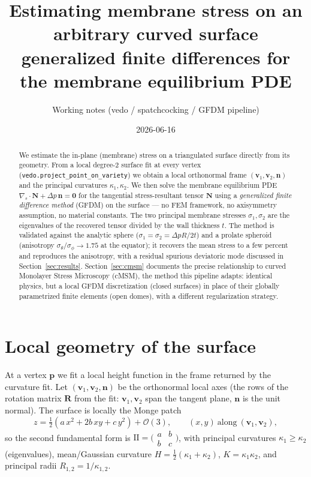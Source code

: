 \documentclass[11pt]{article}
\title{Estimating membrane stress on an arbitrary curved surface\\
\large generalized finite differences for the membrane equilibrium PDE}
\author{Working notes (vedo / spatchcocking / GFDM pipeline)}
\date{2026-06-16}
\newcommand{\vv}[1]{\bm{#1}}
\newcommand{\R}{\mathbf{R}}
\newcommand{\NN}{\mathbf{N}}
\newcommand{\nn}{\vv{n}}
\newcommand{\kone}{\kappa_1}
\newcommand{\ktwo}{\kappa_2}
\newcommand{\Hmean}{H}
\newcommand{\Kgauss}{K}
\newcommand{\divs}{\nabla_{\!s}\!\cdot}
\begin{document}
\maketitle

\begin{abstract}
We estimate the in-plane (membrane) stress on a triangulated surface directly from its
geometry. From a local degree-2 surface fit at every vertex
(\texttt{vedo.project\_point\_on\_variety}) we obtain a local orthonormal frame
$(\vv{v}_1,\vv{v}_2,\vv{n})$ and the principal curvatures $\kone,\ktwo$. We then solve the
membrane equilibrium PDE $\divs\NN+\Delta p\,\nn=\vv{0}$ for the tangential stress-resultant
tensor $\NN$ using a \emph{generalized finite difference method} (GFDM) on the surface ---
no FEM framework, no axisymmetry assumption, no material constants. The two principal
membrane stresses $\sigma_1,\sigma_2$ are the eigenvalues of the recovered tensor divided
by the wall thickness $t$. The method is validated against the analytic sphere
($\sigma_1=\sigma_2=\Delta pR/2t$) and a prolate spheroid (anisotropy
$\sigma_\theta/\sigma_\phi\to1.75$ at the equator); it recovers the mean stress to a few
percent and reproduces the anisotropy, with a residual spurious deviatoric mode discussed
in Section~\ref{sec:results}. Section~\ref{sec:cmsm} documents the precise relationship to
curved Monolayer Stress Microscopy (cMSM), the method this pipeline adapts: identical
physics, but a local GFDM discretization (closed surfaces) in place of their globally
parametrized finite elements (open domes), with a different regularization strategy.
\end{abstract}

\section{Local geometry of the surface}

At a vertex $\vv{p}$ we fit a local height function in the frame returned by the curvature
fit. Let $(\vv{v}_1,\vv{v}_2,\vv{n})$ be the orthonormal local axes (the rows of the
rotation matrix $\R$ from the fit: $\vv{v}_1,\vv{v}_2$ span the tangent plane, $\vv{n}$ is
the unit normal). The surface is locally the Monge patch
\begin{equation}
  z = \tfrac12\!\left(a\,x^2 + 2b\,xy + c\,y^2\right) + \mathcal{O}(3),
  \qquad (x,y)\ \text{along}\ (\vv{v}_1,\vv{v}_2),
\end{equation}
so the second fundamental form is $\mathrm{I\!I}=\bigl(\begin{smallmatrix}a&b\\b&c\end{smallmatrix}\bigr)$,
with principal curvatures $\kone\ge\ktwo$ (eigenvalues), mean/Gaussian curvature
$\Hmean=\tfrac12(\kone+\ktwo)$, $\Kgauss=\kone\ktwo$, and principal radii
$R_{1,2}=1/\kappa_{1,2}$.
\end{document}

